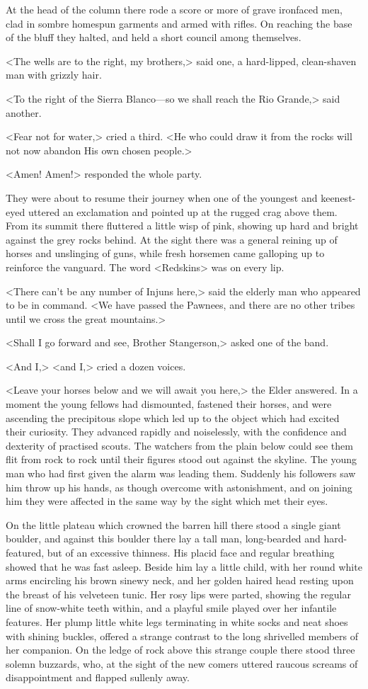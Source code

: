 At the head of the column there rode a score or more of grave ironfaced men, clad in sombre homespun garments and armed with rifles. On reaching the base of the bluff they halted, and held a short council among themselves.

<The wells are to the right, my brothers,> said one, a hard-lipped, clean-shaven man with grizzly hair.

<To the right of the Sierra Blanco—so we shall reach the Rio Grande,> said another.

<Fear not for water,> cried a third. <He who could draw it from the rocks will not now abandon His own chosen people.>

<Amen! Amen!> responded the whole party.

They were about to resume their journey when one of the youngest and keenest-eyed uttered an exclamation and pointed up at the rugged crag above them. From its summit there fluttered a little wisp of pink, showing up hard and bright against the grey rocks behind. At the sight there was a general reining up of horses and unslinging of guns, while fresh horsemen came galloping up to reinforce the vanguard. The word <Redskins> was on every lip.

<There can't be any number of Injuns here,> said the elderly man who appeared to be in command. <We have passed the Pawnees, and there are no other tribes until we cross the great mountains.>

<Shall I go forward and see, Brother Stangerson,> asked one of the band.

<And I,> <and I,> cried a dozen voices.

<Leave your horses below and we will await you here,> the Elder answered. In a moment the young fellows had dismounted, fastened their horses, and were ascending the precipitous slope which led up to the object which had excited their curiosity. They advanced rapidly and noiselessly, with the confidence and dexterity of practised scouts. The watchers from the plain below could see them flit from rock to rock until their figures stood out against the skyline. The young man who had first given the alarm was leading them. Suddenly his followers saw him throw up his hands, as though overcome with astonishment, and on joining him they were affected in the same way by the sight which met their eyes.

On the little plateau which crowned the barren hill there stood a single giant boulder, and against this boulder there lay a tall man, long-bearded and hard-featured, but of an excessive thinness. His placid face and regular breathing showed that he was fast asleep. Beside him lay a little child, with her round white arms encircling his brown sinewy neck, and her golden haired head resting upon the breast of his velveteen tunic. Her rosy lips were parted, showing the regular line of snow-white teeth within, and a playful smile played over her infantile features. Her plump little white legs terminating in white socks and neat shoes with shining buckles, offered a strange contrast to the long shrivelled members of her companion. On the ledge of rock above this strange couple there stood three solemn buzzards, who, at the sight of the new comers uttered raucous screams of disappointment and flapped sullenly away.

